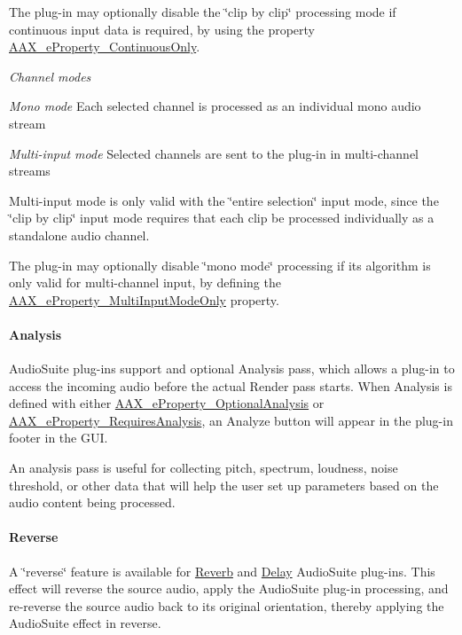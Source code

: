 The plug-\/in may optionally disable the \char`\"{}clip by clip\char`\"{} processing mode if continuous input data is required, by using the property \mbox{\hyperlink{a00662_a13e384f22825afd3db6d68395b79ce0da95054276be8782d93437cd74669366d0}{A\+A\+X\+\_\+e\+Property\+\_\+\+Continuous\+Only}}.

{\itshape Channel modes } 
\begin{DoxyItemize}
\item {\itshape  Mono mode} Each selected channel is processed as an individual mono audio stream  
\item {\itshape  Multi-\/input mode} Selected channels are sent to the plug-\/in in multi-\/channel streams  
\end{DoxyItemize}

Multi-\/input mode is only valid with the \char`\"{}entire selection\char`\"{} input mode, since the \char`\"{}clip by clip\char`\"{} input mode requires that each clip be processed individually as a standalone audio channel.

The plug-\/in may optionally disable \char`\"{}mono mode\char`\"{} processing if its algorithm is only valid for multi-\/channel input, by defining the \mbox{\hyperlink{a00662_a13e384f22825afd3db6d68395b79ce0daa15cf3edd899af4a98fa18fcdfdeb9d6}{A\+A\+X\+\_\+e\+Property\+\_\+\+Multi\+Input\+Mode\+Only}} property.

\hypertarget{a00830_subsubsection__analysis_}{}\paragraph{Analysis}\label{a00830_subsubsection__analysis_}
 Audio\+Suite plug-\/ins support and optional Analysis pass, which allows a plug-\/in to access the incoming audio before the actual Render pass starts. When Analysis is defined with either \mbox{\hyperlink{a00662_a13e384f22825afd3db6d68395b79ce0da5a2bacb421fc36f890a121f01a9e72ba}{A\+A\+X\+\_\+e\+Property\+\_\+\+Optional\+Analysis}} or \mbox{\hyperlink{a00662_a13e384f22825afd3db6d68395b79ce0da925c49bb79454b33bf1d5f4cb09d373f}{A\+A\+X\+\_\+e\+Property\+\_\+\+Requires\+Analysis}}, an Analyze button will appear in the plug-\/in footer in the G\+UI.

An analysis pass is useful for collecting pitch, spectrum, loudness, noise threshold, or other data that will help the user set up parameters based on the audio content being processed.

\hypertarget{a00830_subsubsection__reverse_}{}\paragraph{Reverse}\label{a00830_subsubsection__reverse_}
 A \char`\"{}reverse\char`\"{} feature is available for \mbox{\hyperlink{a00491_aef9637518fb1ac0e2f403444c73aba4aa3a6bc05ef91a38b7c496236b8a28ab6d}{Reverb}} and \mbox{\hyperlink{a00491_aef9637518fb1ac0e2f403444c73aba4aa30cbbd310bb38aad2326dc183f9ca27b}{Delay}} Audio\+Suite plug-\/ins. This effect will reverse the source audio, apply the Audio\+Suite plug-\/in processing, and re-\/reverse the source audio back to its original orientation, thereby applying the Audio\+Suite effect in reverse.

